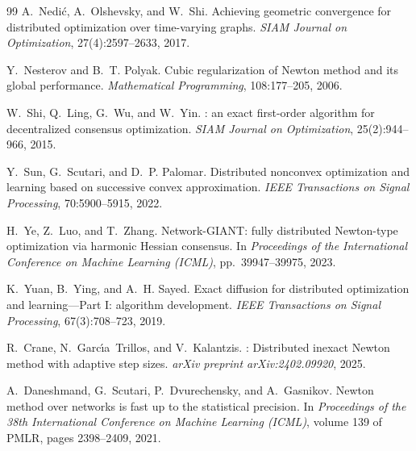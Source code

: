 \documentclass[11pt,a4paper]{article}
\begin{document}
\begin{thebibliography}{99}
		A.~Nedi{\'c}, A.~Olshevsky, and W.~Shi.
		\newblock Achieving geometric convergence for distributed optimization over time-varying graphs.
		\newblock \emph{SIAM Journal on Optimization}, 27(4):2597--2633, 2017.
		
		Y.~Nesterov and B.~T. Polyak.
		\newblock Cubic regularization of {N}ewton method and its global performance.
		\newblock \emph{Mathematical Programming}, 108:177--205, 2006.
		
		W.~Shi, Q.~Ling, G.~Wu, and W.~Yin.
		: an exact first-order algorithm for decentralized consensus optimization.
		\newblock \emph{SIAM Journal on Optimization}, 25(2):944--966, 2015.
		
		Y.~Sun, G.~Scutari, and D.~P. Palomar.
		\newblock Distributed nonconvex optimization and learning based on successive convex approximation.
		\newblock \emph{IEEE Transactions on Signal Processing}, 70:5900--5915, 2022.
		
		H.~Ye, Z.~Luo, and T.~Zhang.
		\newblock Network-{GIANT}: fully distributed {N}ewton-type optimization via harmonic Hessian consensus.
		\newblock In \emph{Proceedings of the International Conference on Machine Learning (ICML)}, pp.~39947--39975, 2023.
		
		K.~Yuan, B.~Ying, and A.~H. Sayed.
		\newblock Exact diffusion for distributed optimization and learning---Part {I}: algorithm development.
		\newblock \emph{IEEE Transactions on Signal Processing}, 67(3):708--723, 2019.
		
		
		R.~Crane, N.~Garc\'{\i}a~Trillos, and V.~Kalantzis.
		: Distributed inexact {N}ewton method with adaptive step sizes.
		\newblock \emph{arXiv preprint arXiv:2402.09920}, 2025.

		A.~Daneshmand, G.~Scutari, P.~Dvurechensky, and A.~Gasnikov.
		\newblock Newton method over networks is fast up to the statistical precision.
		\newblock In \emph{Proceedings of the 38th International Conference on Machine Learning (ICML)}, volume 139 of PMLR, pages 2398--2409, 2021.
		

\end{thebibliography}
\end{document}
